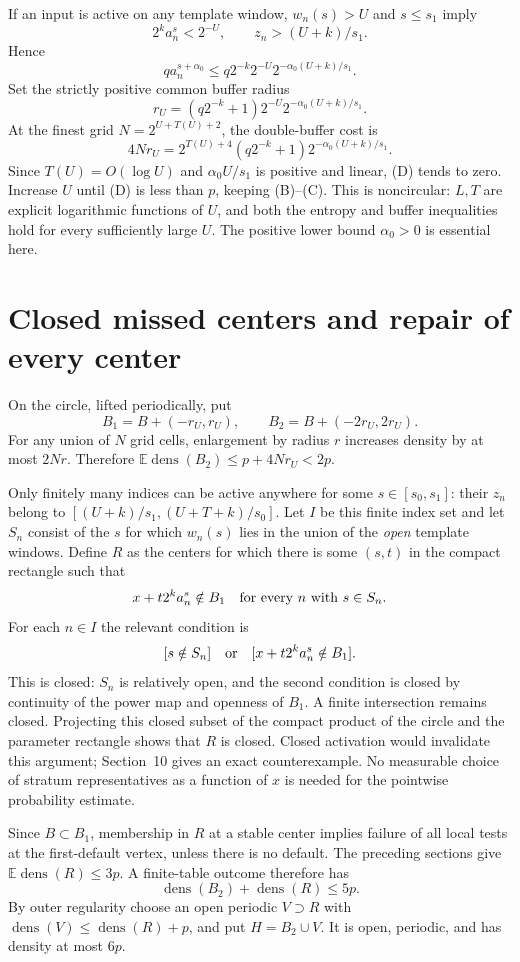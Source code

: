 \documentclass[11pt,letterpaper]{article}
\newcommand{\rhoo}{\operatorname{dens}}
\begin{document}
If an input is active on any template window, $w_n(s)>U$ and $s\le s_1$ imply
\[
 2^ka_n^s<2^{-U},\qquad z_n>(U+k)/s_1.
\]
Hence
\[
 q a_n^{s+\alpha_0}
 \le q2^{-k}2^{-U}2^{-\alpha_0(U+k)/s_1}.
\]
Set the strictly positive common buffer radius
\[
 r_U=(q2^{-k}+1)2^{-U}2^{-\alpha_0(U+k)/s_1}.
\]
At the finest grid $N=2^{U+T(U)+2}$, the double-buffer cost is
\[
 4Nr_U=2^{T(U)+4}(q2^{-k}+1)2^{-\alpha_0(U+k)/s_1}.        \tag{D}
\]
Since $T(U)=O(\log U)$ and $\alpha_0U/s_1$ is positive and linear, (D) tends
to zero. Increase $U$ until (D) is less than $p$, keeping (B)--(C).
This is noncircular: $L,T$ are explicit logarithmic functions of $U$, and both
the entropy and buffer inequalities hold for every sufficiently large $U$.
The positive lower bound $\alpha_0>0$ is essential here.

\section{Closed missed centers and repair of every center}
On the circle, lifted periodically, put
\[
 B_1=B+(-r_U,r_U),\qquad B_2=B+(-2r_U,2r_U).
\]
For any union of $N$ grid cells, enlargement by radius $r$ increases density
by at most $2Nr$. Therefore $\mathbb E\rhoo(B_2)\le p+4Nr_U<2p$.

Only finitely many indices can be active anywhere for some $s\in[s_0,s_1]$:
their $z_n$ belong to $[(U+k)/s_1,(U+T+k)/s_0]$. Let $I$ be this finite index
set and let $S_n$ consist of the $s$ for which $w_n(s)$ lies in the union of the
\emph{open} template windows. Define $R$ as the centers for which there is
some $(s,t)$ in the compact rectangle such that
\[
 x+t2^ka_n^s\notin B_1\quad\hbox{for every $n$ with $s\in S_n$}.
\]
For each $n\in I$ the relevant condition is
\[
 [s\notin S_n]\quad\hbox{or}\quad[x+t2^ka_n^s\notin B_1].
\]
This is closed: $S_n$ is relatively open, and the second condition is closed
by continuity of the power map and openness of $B_1$. A finite intersection
remains closed. Projecting this closed subset of the compact product of the
circle and the parameter rectangle shows that $R$ is closed. Closed activation
would invalidate this argument; Section~10 gives an exact counterexample.
No measurable choice of stratum representatives as a function of $x$ is needed
for the pointwise probability estimate.

Since $B\subset B_1$, membership in $R$ at a stable center implies failure
of all local tests at the first-default vertex, unless there is no default.
The preceding sections give $\mathbb E\rhoo(R)\le3p$. A finite-table outcome
therefore has
\[
 \rhoo(B_2)+\rhoo(R)\le5p.
\]
By outer regularity choose an open periodic $V\supset R$ with
$\rhoo(V)\le\rhoo(R)+p$, and put $H=B_2\cup V$. It is open, periodic, and
has density at most $6p$.
\end{document}
